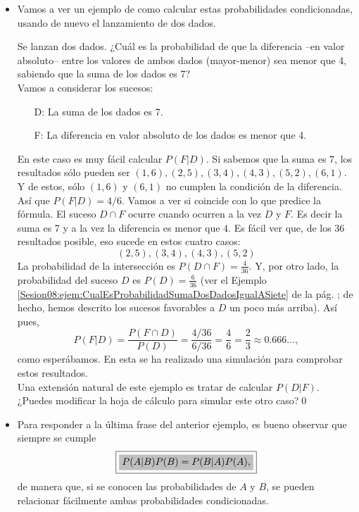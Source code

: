 \begin{itemize}
    \item Vamos a ver un ejemplo de como calcular estas probabilidades condicionadas, usando de nuevo el lanzamiento de dos dados.
    \begin{Ejemplo}\label{ejem:probabilidadCondicionadaLanzamientoDosDados}
    Se lanzan dos dados. ¿Cuál es la probabilidad de que la diferencia --en valor absoluto-- entre los valores de ambos dados (mayor-menor) sea menor que 4, sabiendo que la suma de los dados es 7?\\
    Vamos a considerar los sucesos:
    \begin{itemize}
        \item[D:] La suma de los dados es 7.
        \item[F:] La diferencia en valor absoluto de los dados es menor que 4.
    \end{itemize}
    En este caso es muy fácil calcular $P(F|D)$. Si sabemos que la suma es $7$, los resultados sólo pueden ser $(1,6),(2,5),(3,4),(4,3),(5,2),(6,1)$. Y de estos, sólo $(1,6)$ y $(6,1)$ no cumplen la condición de la diferencia. Así que $P(F|D)=4/6$. Vamos a ver si coincide con lo que predice la fórmula. El suceso $D\cap F$ ocurre cuando ocurren {\sf a la vez} $D$ y $F$. Es decir la suma es 7 {\sf y a la vez} la diferencia es menor que $4$. Es fácil ver que, de los 36 resultados posible, eso sucede en estos cuatro casos: \[(2,5),(3,4),(4,3),(5,2)\]
    La probabilidad de la intersección es $P(D\cap F)=\frac{4}{36}$. Y, por otro lado, la probabilidad del suceso $D$ es $P(D)=\frac{6}{36}$ (ver el Ejemplo \ref{Sesion08:ejem:CualEsProbabilidadSumaDosDadosIgualASiete} de la pág. \pageref{Sesion08:ejem:CualEsProbabilidadSumaDosDadosIgualASiete}; de hecho, hemos descrito los sucesos favorables a $D$ un poco más arriba). Así pues,
    \[P(F|D)=\dfrac{P(F\cap D)}{P(D)}=\dfrac{4/36}{6/36}=\dfrac{4}{6}=\dfrac{2}{3}\approx 0.666\ldots,\]
    como esperábamos. En esta  se ha realizado una simulación para comprobar estos resultados.\\
    Una extensión natural de este ejemplo es tratar de calcular $P(D|F)$. ¿Puedes modificar la hoja de cálculo para simular este otro caso?\qed
    \end{Ejemplo}
\item  Para responder a la última frase del anterior ejemplo, es bueno observar que siempre se cumple
        \[\fbox{\colorbox{Gris025}{$P(A|B)P(B)=P(B|A)P(A),$}}\]
        de manera que, si se conocen las probabilidades de $A$ y $B$, se pueden relacionar fácilmente ambas probabilidades condicionadas.
\end{itemize}

